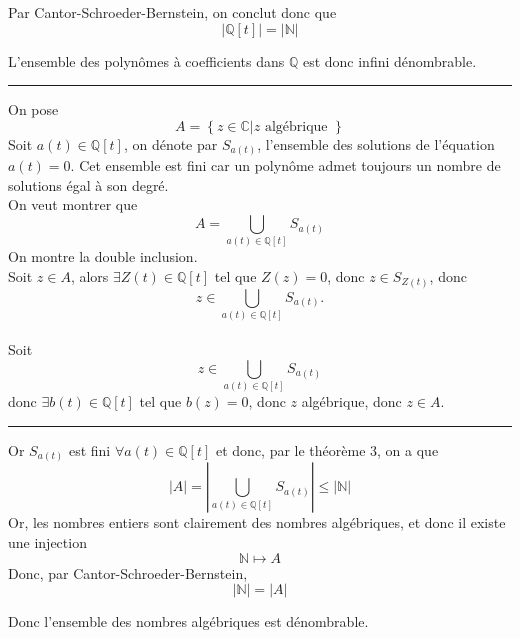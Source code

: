 \documentclass[11pt, a4paper]{article}
\newcommand\hr{
    \noindent\rule[0.5ex]{\linewidth}{0.5pt}\newline
}
\begin{document}
Par Cantor-Schroeder-Bernstein, on conclut donc que
\[ 
	|\mathbb{Q}[t]| = |\mathbb{N}|
\]

L'ensemble des polynômes à coefficients dans $\mathbb{Q}$ est donc infini dénombrable.






\hr
On pose
\[ 
A = \left\{ z \in \mathbb{C} | z \text{ algébrique }  \right\}
\]
Soit $a(t) \in \mathbb{Q}[t]$, on dénote par $S_{a(t)}$, l'ensemble des solutions de l'équation $a(t)=0$. Cet ensemble est fini car un polynôme admet toujours un nombre de solutions égal à son degré.\\
On veut montrer que 
\[ 
	A = \bigcup_{a(t) \in \mathbb{Q}[t]} S_{a(t)} 
\]
On montre la double inclusion.\\
Soit $z \in A$, alors $\exists Z(t) \in \mathbb{Q}[t]$ tel que $Z(z)=0$, donc $z \in S_{Z(t)} $, donc 
$$z \in \bigcup_{a(t) \in \mathbb{Q}[t]} S_{a(t)}. $$\\
Soit
$$z \in \bigcup_{a(t) \in \mathbb{Q}[t]} S_{a(t)}  $$
donc $\exists b(t) \in \mathbb{Q}[t]$ tel que $b(z)=0$, donc $z$ algébrique, donc $z \in A$.\\
\hr
Or $ S_{a(t)} $ est fini $\forall a(t) \in \mathbb{Q}[t]$ et donc, par le théorème 3, on a que
\[ 
|A| =	|\bigcup_{a(t) \in \mathbb{Q}[t]} S_{a(t)} | \leq |\mathbb{N}|
\]
Or, les nombres entiers sont clairement des nombres algébriques, et donc il existe une injection
\[ 
\mathbb{N} \mapsto A
\]
Donc, par Cantor-Schroeder-Bernstein,
\[ 
|\mathbb{N}| = |A|
\]

Donc l'ensemble des nombres algébriques est dénombrable.
\end{document}
